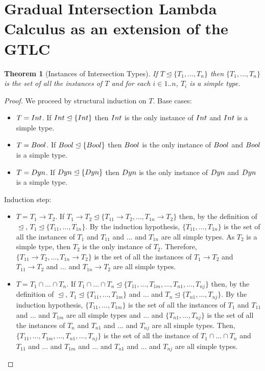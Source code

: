 \documentclass[a4paper]{article}
\newtheorem{theorem}{Theorem}[section]
\begin{document}
\section{Gradual Intersection Lambda Calculus as an extension of the GTLC}
\begin{theorem}[Instances of Intersection Types]
\label{instances_intersection_types}
If $T \trianglelefteq \{T_1, \ldots, T_n\}$ then $\{T_1, \ldots, T_n\}$ is the set of all the instances of $T$ and for each $i \in 1 .. n$, $T_i$ is a simple type.
\end{theorem}
\begin{proof}
We proceed by structural induction on $T$.
Base cases:
\begin{itemize}
    \item $T = {Int}$.
    If ${Int} \trianglelefteq \{{Int}\}$ then ${Int}$ is the only instance of ${Int}$ and ${Int}$ is a simple type.
    \item $T = Bool$.
    If $Bool \trianglelefteq \{Bool\}$ then $Bool$ is the only instance of $Bool$ and $Bool$ is a simple type.
    \item $T = Dyn$.
    If $Dyn \trianglelefteq \{Dyn\}$ then $Dyn$ is the only instance of $Dyn$ and $Dyn$ is a simple type.
\end{itemize}
Induction step:
\begin{itemize}
    \item $T = T_1 \rightarrow T_2$.
    If $T_1 \rightarrow T_2 \trianglelefteq \{T_{11} \rightarrow T_2, \ldots, T_{1n} \rightarrow T_2\}$ then, by the definition of $\trianglelefteq$, $T_1 \trianglelefteq \{T_{11}, \ldots, T_{1n}\}$.
    By the induction hypothesis, $\{T_{11}, \ldots, T_{1n}\}$ is the set of all the instances of $T_1$ and $T_{11}$ and ... and $T_{1n}$ are all simple types.
    As $T_2$ is a simple type, then $T_2$ is the only instance of $T_2$.
    Therefore, $\{T_{11} \rightarrow T_2, \ldots, T_{1n} \rightarrow T_2\}$ is the set of  all the instances of $T_1 \rightarrow T_2$ and $T_{11} \rightarrow T_2$ and ... and $T_{1n} \rightarrow T_2$ are all simple types.
    \item $T = T_1 \cap \ldots \cap T_n$.
    If $T_1 \cap \ldots \cap T_n \trianglelefteq \{T_{11}, \ldots, T_{1m}, \ldots, T_{n1}, \ldots, T_{nj}\}$ then, by the definition of $\trianglelefteq$, $T_1 \trianglelefteq \{T_{11}, \ldots, T_{1m}\}$ and ... and $T_n \trianglelefteq \{T_{n1}, \ldots, T_{nj}\}$.
    By the induction hypothesis, $\{T_{11}, \ldots, T_{1m}\}$ is the set of all the instances of $T_1$ and $T_{11}$ and ... and $T_{1m}$ are all simple types and ... and $\{T_{n1}, \ldots, T_{nj}\}$ is the set of all the instances of $T_n$ and $T_{n1}$ and ... and $T_{nj}$ are all simple types.
    Then, $\{T_{11}, \ldots, T_{1m}, \ldots, T_{n1}, \ldots, T_{nj}\}$ is the set of all the instance of $T_1 \cap \ldots \cap T_n$ and $T_{11}$ and ... and $T_{1m}$ and ... and $T_{n1}$ and ... and $T_{nj}$ are all simple types.
\end{itemize}
\end{proof}
\end{document}
